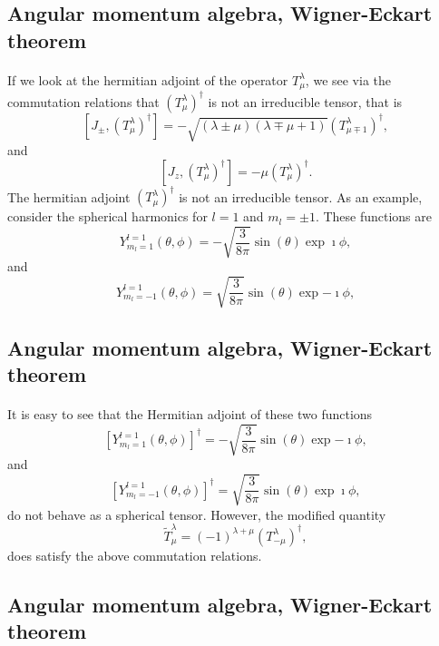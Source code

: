\documentclass[%
twoside,                 %
final,                   %
10pt]{article}
\begin{document}
\subsection*{Angular momentum algebra, Wigner-Eckart theorem}

\paragraph{}
If we look at the hermitian adjoint of the operator $T^{\lambda}_{\mu}$, 
we see via the commutation relations that $(T^{\lambda}_{\mu})^{\dagger}$ is not an irreducible tensor, that is
\[
[J_{\pm}, (T^{\lambda}_{\mu})^{\dagger}]= -\sqrt{(\lambda\pm \mu)(\lambda\mp \mu+1)}(T^{\lambda}_{\mu\mp 1})^{\dagger},
\]
and 
\[
[J_{z}, (T^{\lambda}_{\mu})^{\dagger}]=-\mu (T^{\lambda}_{\mu})^{\dagger}.
\]
The hermitian adjoint $(T^{\lambda}_{\mu})^{\dagger}$ is not an irreducible tensor. As an example, consider the spherical harmonics for 
$l=1$ and $m_l=\pm 1$. These functions are 
\[
Y^{l=1}_{m_l=1}(\theta,\phi)=-\sqrt{\frac{3}{8\pi}}\sin{(\theta)}\exp{\imath\phi},
\]
and
\[
Y^{l=1}_{m_l=-1}(\theta,\phi)=\sqrt{\frac{3}{8\pi}}\sin{(\theta)}\exp{-\imath\phi},
\]


\subsection*{Angular momentum algebra, Wigner-Eckart theorem}

\paragraph{}
It is easy to see that the Hermitian adjoint of these two functions
\[
\left[Y^{l=1}_{m_l=1}(\theta,\phi)\right]^{\dagger}=-\sqrt{\frac{3}{8\pi}}\sin{(\theta)}\exp{-\imath\phi},
\]
and 
\[
\left[Y^{l=1}_{m_l=-1}(\theta,\phi)\right]^{\dagger}=\sqrt{\frac{3}{8\pi}}\sin{(\theta)}\exp{\imath\phi},
\]
do not behave as a spherical tensor. However, the modified quantity 
\[
\tilde{T}^{\lambda}_{\mu}=(-1)^{\lambda+\mu}(T^{\lambda}_{-\mu})^{\dagger},
\]
does satisfy the above commutation relations.


\subsection*{Angular momentum algebra, Wigner-Eckart theorem}
\end{document}
